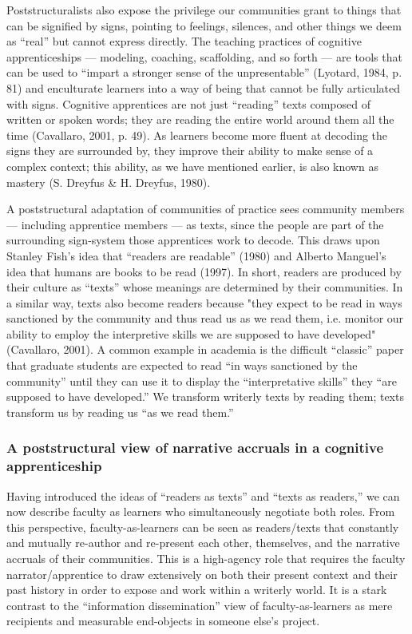 Poststructuralists also expose the privilege our communities grant to things that can be signified by signs, pointing to feelings, silences, and other things we deem as “real” but cannot express directly. The teaching practices of cognitive apprenticeships — modeling, coaching, scaffolding, and so forth — are tools that can be used to “impart a stronger sense of the unpresentable” (Lyotard, 1984, p. 81) and enculturate learners into a way of being that cannot be fully articulated with signs. Cognitive apprentices are not just “reading” texts composed of written or spoken words; they are reading the entire world around them all the time (Cavallaro, 2001, p. 49). As learners become more fluent at decoding the signs they are surrounded by, they improve their ability to make sense of a complex context; this ability, as we have mentioned earlier, is also known as mastery (S. Dreyfus & H. Dreyfus, 1980).

A poststructural adaptation of communities of practice sees community members — including apprentice members — as texts, since the people are part of the surrounding sign-system those apprentices work to decode. This draws upon Stanley Fish's idea that “readers are readable” (1980) and Alberto Manguel’s idea that humans are books to be read (1997). In short, readers are produced by their culture as “texts” whose meanings are determined by their communities. In a similar way, texts also become readers because "they expect to be read in ways sanctioned by the community and thus read us as we read them, i.e. monitor our ability to employ the interpretive skills we are supposed to have developed" (Cavallaro, 2001). A common example in academia is the difficult “classic” paper that graduate students are expected to read “in ways sanctioned by the community” until they can use it to display the “interpretative skills” they “are supposed to have developed.” We transform writerly texts by reading them; texts transform us by reading us “as we read them.”

\subsubsection{A poststructural view of narrative accruals in a cognitive apprenticeship}

Having introduced the ideas of “readers as texts” and “texts as readers,” we can now describe faculty as learners who simultaneously negotiate both roles. From this perspective, faculty-as-learners can be seen as readers/texts that constantly and mutually re-author and re-present each other, themselves, and the narrative accruals of their communities. This is a high-agency role that requires the faculty narrator/apprentice to draw extensively on both their present context and their past history in order to expose and work within a writerly world. It is a stark contrast to the “information dissemination” view of faculty-as-learners as mere recipients and measurable end-objects in someone else’s project.


